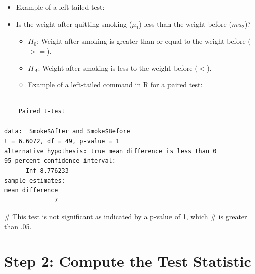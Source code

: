 \documentclass[
  letterpaper,
  DIV=11,
  numbers=noendperiod]{scrreprt}
\newenvironment{Shaded}{\begin{snugshade}}{\end{snugshade}}
\newcommand{\AttributeTok}[1]{\textcolor[rgb]{0.40,0.45,0.13}{#1}}
\newcommand{\CommentTok}[1]{\textcolor[rgb]{0.37,0.37,0.37}{#1}}
\newcommand{\ConstantTok}[1]{\textcolor[rgb]{0.56,0.35,0.01}{#1}}
\newcommand{\FunctionTok}[1]{\textcolor[rgb]{0.28,0.35,0.67}{#1}}
\newcommand{\NormalTok}[1]{\textcolor[rgb]{0.00,0.23,0.31}{#1}}
\newcommand{\SpecialCharTok}[1]{\textcolor[rgb]{0.37,0.37,0.37}{#1}}
\newcommand{\StringTok}[1]{\textcolor[rgb]{0.13,0.47,0.30}{#1}}
\providecommand{\tightlist}{%
  \setlength{\itemsep}{0pt}\setlength{\parskip}{0pt}}\usepackage{longtable,booktabs,array}
\begin{document}
\begin{itemize}
\tightlist
\item
  Example of a left-tailed test:
\item
  Is the weight after quitting smoking (\(\mu_1\)) less than the weight
  before (\(mu_2\))?

  \begin{itemize}
  \tightlist
  \item
    \(H_0\): Weight after smoking is greater than or equal to the weight
    before (\(>=\)).
  \item
    \(H_A\): Weight after smoking is less to the weight before (\(<\)).
  \item
    Example of a left-tailed command in R for a paired test:
  \end{itemize}
\end{itemize}

\begin{Shaded}
\end{Shaded}

\begin{verbatim}

    Paired t-test

data:  Smoke$After and Smoke$Before
t = 6.6072, df = 49, p-value = 1
alternative hypothesis: true mean difference is less than 0
95 percent confidence interval:
     -Inf 8.776233
sample estimates:
mean difference 
              7 
\end{verbatim}

\begin{Shaded}
\begin{Highlighting}[]
\CommentTok{\# This test is not significant as indicated by a p{-}value of 1, which}
\CommentTok{\# is greater than .05.}
\end{Highlighting}
\end{Shaded}

\section{Step 2: Compute the Test
Statistic}\label{step-2-compute-the-test-statistic-1}
\end{document}
